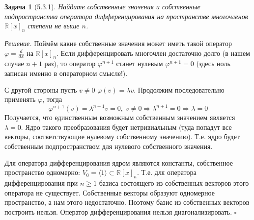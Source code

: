\documentclass[a4paper,12pt]{article}
\newtheorem*{prob}{Задача}
\newenvironment{soln}{\noindent\textit{Решение.}}{\hfill$\square$}
\begin{document}
\begin{prob}[5.3.1]
	Найдите собственные значения и собственные подпространства оператора дифференцирования на пространстве многочленов $\mathbb{R}[x]_n$ степени не выше $n$.
\end{prob}
\begin{soln}
	Поймём какие собственные значения может иметь такой оператор $\varphi = \frac{d}{dx}$ на $\mathbb{R}[x]_n$. Если дифференцировать многочлен достаточно долго (в нашем случае $n+1$ раз), то оператор $\varphi^{n+1}$ станет нулевым $\varphi^{n+1} = 0$ (здесь ноль записан именно в операторном смысле!).
	
	С другой стороны пусть $v \ne 0$ $\varphi(v) = \lambda v$. Продолжим последовательно применять $\varphi$, тогда
	\[
	 	\varphi^{n+1} (v) = \lambda^{n+1} v = 0, \; v \ne 0 \Rightarrow \lambda^{n+1} = 0 \Rightarrow \lambda = 0
	\]
	Получается, что единственным возможным собственным значением является $\lambda = 0$. Ядро такого преобразования будет нетривиальным (туда попадут все векторы, соответствующие нулевому собственному значению). Т.е. ядро будет собственным подпространством для нулевого собственного значения. 
	
	Для оператора дифференцирования ядром являются константы, собственное пространство одномерно: $V_0 = \langle 1 \rangle \subset \mathbb{R}[x]_n$. Т.е. для оператора дифференцирования при $n \ge 1$ базиса состоящего из собственных векторов этого оператора не существует. Собственные векторы образуют одномерное пространство, а нам этого недостаточно. Поэтому базис из собственных векторов построить нельзя. Оператор дифференцирования нельзя диагонализировать.
\end{soln}
\end{document}
